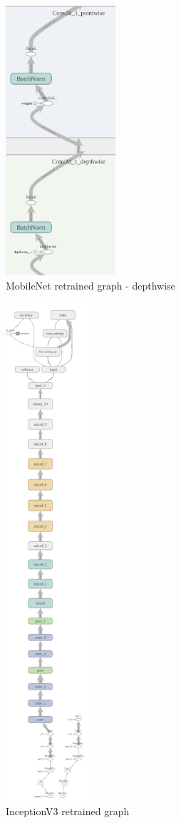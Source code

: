 \begin{figure}[htbp]
\centering
\includegraphics[height=10cm]{includes/graphMobilenet050-700DepthLayer}
\caption{MobileNet retrained graph - depthwise}
\label{fig:MobileNet retrained graph - depthwise}
\end{figure}

\newpage


\begin{figure}[htbp]
\centering
\includegraphics[height=18.5cm]{includes/graphInception4000}
\caption{InceptionV3 retrained graph}
\label{fig:InceptionV3 retrained graph}
\end{figure}

